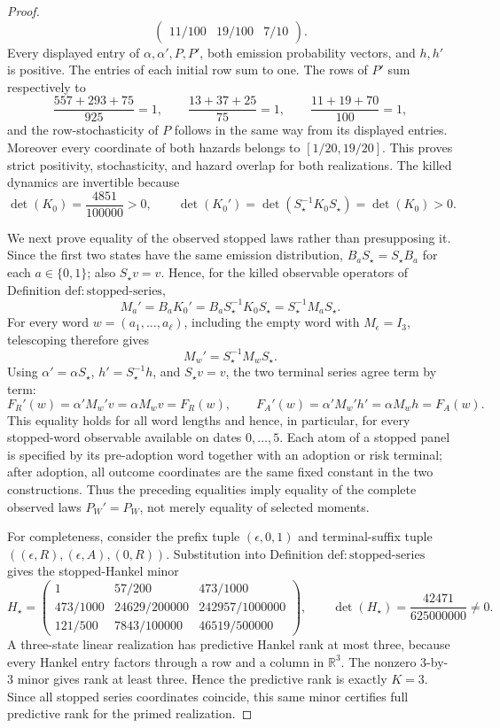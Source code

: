 \documentclass{article}
\begin{document}
\begin{proof}
\[\begin{pmatrix}
 11/100&19/100&7/10
 \end{pmatrix}.
\]
Every displayed entry of \(\alpha,\alpha',P,P'\), both emission probability vectors, and \(h,h'\) is positive.  The entries of each initial row sum to one.  The rows of \(P'\) sum respectively to
\[
 \frac{557+293+75}{925}=1,\qquad
 \frac{13+37+25}{75}=1,\qquad
 \frac{11+19+70}{100}=1,
\]
and the row-stochasticity of \(P\) follows in the same way from its displayed entries.  Moreover every coordinate of both hazards belongs to \([1/20,19/20]\).  This proves strict positivity, stochasticity, and hazard overlap for both realizations.  The killed dynamics are invertible because
\[
 \det(K_0)=\frac{4851}{100000}>0,
 \qquad
 \det(K_0')=\det(S_{\star}^{-1}K_0S_{\star})
 =\det(K_0)>0.
\]

We next prove equality of the observed stopped laws rather than presupposing it.  Since the first two states have the same emission distribution, \(B_aS_{\star}=S_{\star}B_a\) for each \(a\in\{0,1\}\); also \(S_{\star}v=v\).  Hence, for the killed observable operators of Definition \(\mathrm{def{:}stopped\text{-}series}\),
\[
 M_a'=B_aK_0'
 =B_aS_{\star}^{-1}K_0S_{\star}
 =S_{\star}^{-1}M_aS_{\star}.
\]
For every word \(w=(a_1,\ldots,a_\ell)\), including the empty word with \(M_\epsilon=I_3\), telescoping therefore gives
\[
 M_w'=S_{\star}^{-1}M_wS_{\star}.
\]
Using \(\alpha'=\alpha S_{\star}\), \(h'=S_{\star}^{-1}h\), and \(S_{\star}v=v\), the two terminal series agree term by term:
\[
 F_R'(w)=\alpha'M_w'v
 =\alpha M_wv=F_R(w),
 \qquad
 F_A'(w)=\alpha'M_w'h'
 =\alpha M_wh=F_A(w).
\]
This equality holds for all word lengths and hence, in particular, for every stopped-word observable available on dates \(0,\ldots,5\).  Each atom of a stopped panel is specified by its pre-adoption word together with an adoption or risk terminal; after adoption, all outcome coordinates are the same fixed constant in the two constructions.  Thus the preceding equalities imply equality of the complete observed laws \(P_W'=P_W\), not merely equality of selected moments.

For completeness, consider the prefix tuple \((\epsilon,0,1)\) and terminal-suffix tuple \(((\epsilon,R),(\epsilon,A),(0,R))\).  Substitution into Definition \(\mathrm{def{:}stopped\text{-}series}\) gives the stopped-Hankel minor
\[
 H_\star=
 \begin{pmatrix}
 1&57/200&473/1000\\
 473/1000&24629/200000&242957/1000000\\
 121/500&7843/100000&46519/500000
 \end{pmatrix},
 \qquad
 \det(H_\star)=\frac{42471}{625000000}\ne0.
\]
A three-state linear realization has predictive Hankel rank at most three, because every Hankel entry factors through a row and a column in \(\mathbb R^3\).  The nonzero \(3\)-by-\(3\) minor gives rank at least three.  Hence the predictive rank is exactly \(K=3\).  Since all stopped series coordinates coincide, this same minor certifies full predictive rank for the primed realization.


\end{proof}
\end{document}
